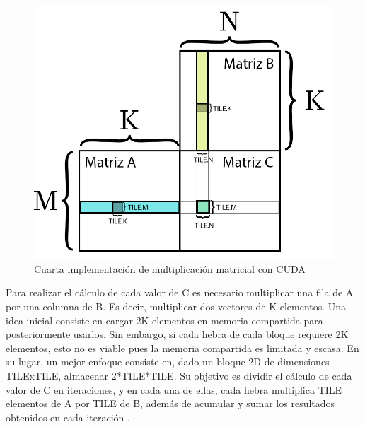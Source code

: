 \begin{figure}[H]
	\centering
	\includegraphics[scale=0.3]{imagenes/gemm_tile_v4.jpg}  
	\caption{Cuarta implementación de multiplicación matricial con CUDA}
	\label{fig:mult_matrix_cuda_v4}
\end{figure}
Para realizar el cálculo de cada valor de C es necesario multiplicar una fila de A por una columna de B. Es decir, multiplicar dos vectores de K elementos. Una idea inicial consiste en cargar 2K elementos en memoria compartida para posteriormente usarlos. Sin embargo, si cada hebra de cada bloque requiere 2K elementos, esto no es viable pues la memoria compartida es limitada y escasa. En su lugar, un mejor enfoque consiste en, dado un bloque 2D de dimensiones TILExTILE, almacenar 2*TILE*TILE. Su objetivo es dividir el cálculo de cada valor de C en iteraciones, y en cada una de ellas, cada hebra multiplica TILE elementos de A por TILE de B, además de acumular y sumar los resultados obtenidos en cada iteración \cite{nvidia_mult_matrix_v4}. \\
